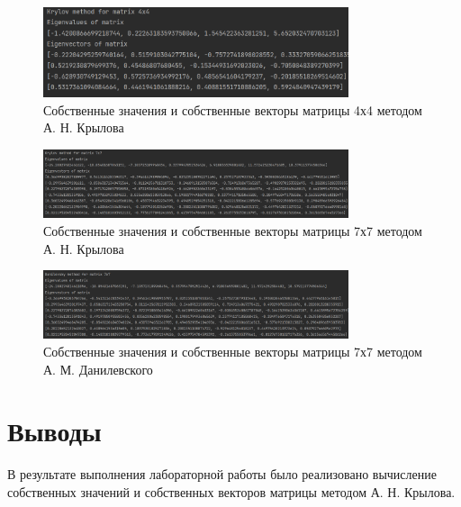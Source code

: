 \documentclass[a4paper, 14pt]{extarticle}
\begin{document}
\begin{figure}[!htb]
	\centering
	\includegraphics[width=0.8\textwidth]{img1}
\caption{Собственные значения и собственные векторы матрицы 4х4 методом А. Н. Крылова}
\label{fig:img1}
\end{figure}

\begin{figure}[!htb]
	\centering
	\includegraphics[width=0.8\textwidth]{img2}
\caption{Собственные значения и собственные векторы матрицы 7х7 методом А. Н. Крылова}
\label{fig:img2}
\end{figure}

\begin{figure}[!htb]
	\centering
	\includegraphics[width=0.8\textwidth]{img3}
\caption{Собственные значения и собственные векторы матрицы 7х7 методом А. М. Данилевского}
\label{fig:img3}
\end{figure}

\section{Выводы}\label{Sect::conclusion}

В результате выполнения лабораторной работы было реализовано вычисление собственных значений и собственных векторов матрицы методом А. Н. Крылова.
\end{document}
